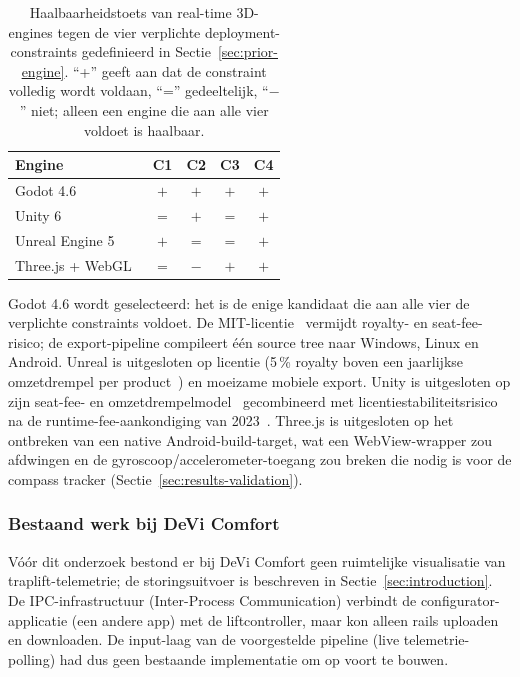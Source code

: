 \documentclass[10pt, a4paper, twocolumn]{article}
\begin{document}
\begin{table}[H]
\centering
\caption{Haalbaarheidstoets van real-time 3D-engines tegen de vier verplichte deployment-constraints gedefinieerd in Sectie~\ref{sec:prior-engine}. ``+'' geeft aan dat de constraint volledig wordt voldaan, ``='' gedeeltelijk, ``$-$'' niet; alleen een engine die aan alle vier voldoet is haalbaar.}
\label{tab:engine-mca}
\small
\begin{tabular}{@{}lcccc@{}}
\toprule
\textbf{Engine} & \textbf{C1} & \textbf{C2} & \textbf{C3} & \textbf{C4} \\
\midrule
Godot 4.6~\cite{linietsky2014godot}           & $+$ & $+$ & $+$ & $+$ \\
Unity 6~\cite{unity2024}                      & $=$ & $+$ & $=$ & $+$ \\
Unreal Engine 5~\cite{epic2022unreal}         & $+$ & $=$ & $=$ & $+$ \\
Three.js + WebGL~\cite{cabello2010threejs}    & $=$ & $-$ & $+$ & $+$ \\
\bottomrule
\end{tabular}
\end{table}

Godot 4.6 wordt geselecteerd: het is de enige kandidaat die aan alle vier de
verplichte constraints voldoet. De MIT-licentie~\cite{linietsky2014godot}
vermijdt royalty- en seat-fee-risico; de export-pipeline compileert één source
tree naar Windows, Linux en Android. Unreal is uitgesloten op licentie (5\,\%
royalty boven een jaarlijkse omzetdrempel per product~\cite{epic2022unreal}) en
moeizame mobiele export. Unity is uitgesloten op zijn seat-fee- en
omzetdrempelmodel~\cite{unity2024} gecombineerd met licentiestabiliteitsrisico
na de runtime-fee-aankondiging van 2023~\cite{schreier2023unity}. Three.js is uitgesloten op
het ontbreken van een native Android-build-target, wat een WebView-wrapper zou
afdwingen en de gyroscoop/accelerometer-toegang zou breken die nodig is voor de
compass tracker (Sectie~\ref{sec:results-validation}).

\subsubsection{Bestaand werk bij DeVi Comfort}
Vóór dit onderzoek bestond er bij DeVi Comfort geen ruimtelijke visualisatie van
traplift-telemetrie; de storingsuitvoer is beschreven in
Sectie~\ref{sec:introduction}. De IPC-infrastructuur (Inter-Process
Communication) verbindt de configurator-applicatie (een andere app) met de
liftcontroller, maar kon alleen rails uploaden en downloaden. De input-laag van
de voorgestelde pipeline (live telemetrie-polling) had dus geen bestaande
implementatie om op voort te bouwen.
\end{document}
